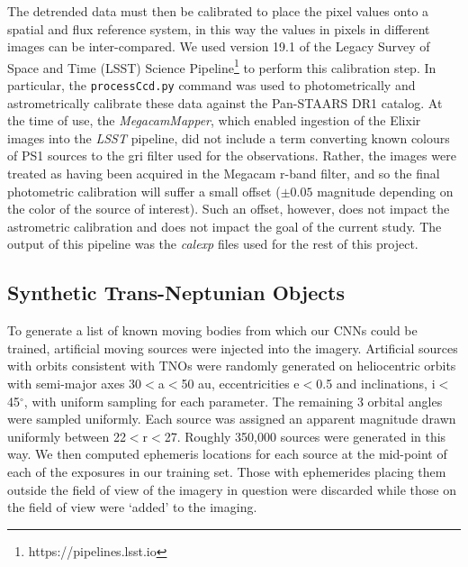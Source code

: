 The detrended data must then be calibrated to place the pixel values onto a spatial and flux reference system, in this way the values in pixels in different images can be inter-compared.  
We used version 19.1 of the Legacy Survey of Space and Time (LSST) Science Pipeline\footnote{https://pipelines.lsst.io} to perform this calibration step.
In particular, the \texttt{processCcd.py} command was used to photometrically and astrometrically calibrate these data against the Pan-STAARS DR1 catalog.
At the time of use, the \emph{MegacamMapper}, which enabled ingestion of the Elixir images into the \emph{LSST} pipeline, did not include a term converting known colours of PS1 sources to the gri filter used for the observations.
Rather, the images were treated as having been acquired in the Megacam r-band filter, and so the final photometric calibration will suffer a small offset ($\pm 0.05$ magnitude depending on the color of the source of interest).
Such an offset, however, does not impact the astrometric calibration and does not impact the goal of the current study.
The output of this pipeline was the \emph{calexp} files used for the rest of this project.

\subsection{Synthetic Trans-Neptunian Objects}
\label{subsect:TNOs}

To generate a list of known moving bodies from which our CNNs could be trained, artificial moving sources were injected into the imagery. 
Artificial sources with orbits consistent with TNOs were randomly generated on heliocentric orbits with semi-major axes 30$<$a$<$50 au, eccentricities e$<$0.5 and inclinations, i$<$45$^\circ$, with uniform sampling for each parameter. 
The remaining 3 orbital angles were sampled uniformly.
Each source was assigned an apparent magnitude drawn uniformly between 22$<$r$<$27.  
Roughly 350,000 sources were generated in this way.
We then computed ephemeris locations for each source at the mid-point of each of the exposures in our training set. 
Those with ephemerides placing them outside the field of view of the imagery in question were discarded while those on the field of view were `added' to the imaging.

